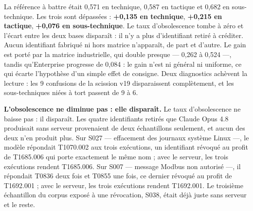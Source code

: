 La référence à battre était 0,571 en technique, 0,587 en tactique et 0,682 en sous-technique. Les trois sont dépassées : \textbf{+0,135 en technique}, \textbf{+0,215 en tactique}, \textbf{+0,076 en sous-technique}. Le taux d'obsolescence tombe à zéro et l'écart entre les deux bases disparaît : il n'y a plus d'identifiant retiré à créditer. Aucun identifiant fabriqué ni hors matrice n'apparaît, de part et d'autre. Le gain est porté par la matrice industrielle, qui double presque --- 0,262 à 0,524 ---, tandis qu'Enterprise progresse de 0,084 : le gain n'est ni général ni uniforme, ce qui écarte l'hypothèse d'un simple effet de consigne. Deux diagnostics achèvent la lecture : les 9 confusions de la scission v19 disparaissent complètement, et les sous-techniques niées à tort passent de 9 à 6.

\textbf{L'obsolescence ne diminue pas : elle disparaît.} Le taux d'obsolescence ne baisse pas : il disparaît. Les quatre identifiants retirés que Claude Opus 4.8 produisait sans serveur provenaient de deux échantillons seulement, et aucun des deux n'en produit plus. Sur S027 --- effacement des journaux système Linux ---, le modèle répondait T1070.002 aux trois exécutions, un identifiant révoqué au profit de T1685.006 qui porte exactement le même nom ; avec le serveur, les trois exécutions rendent T1685.006. Sur S007 --- message Modbus non autorisé ---, il répondait T0836 deux fois et T0855 une fois, ce dernier révoqué au profit de T1692.001 ; avec le serveur, les trois exécutions rendent T1692.001. Le troisième échantillon du corpus exposé à une révocation, S038, était déjà juste sans serveur et le reste.

